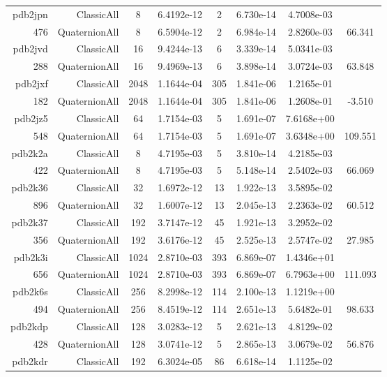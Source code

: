 \begin{xltabular}{\textwidth}{r|rcS[table-format=1.4e+2]cS[table-format=1.3e+2]S[table-format=1.4e+2]S[table-format=-1.3]}
pdb2jpn & ClassicAll & 8 & 6.4192e-12 & 2 & 6.730e-14 & 4.7008e-03 & \\
476 & QuaternionAll & 8 & 6.5904e-12 & 2 & 6.984e-14 & 2.8260e-03 & 66.341\\  \addlinespace
pdb2jvd & ClassicAll & 16 & 9.4244e-13 & 6 & 3.339e-14 & 5.0341e-03 & \\
288 & QuaternionAll & 16 & 9.4969e-13 & 6 & 3.898e-14 & 3.0724e-03 & 63.848\\  \addlinespace
pdb2jxf & ClassicAll & 2048 & 1.1644e-04 & 305 & 1.841e-06 & 1.2165e-01 & \\
182 & QuaternionAll & 2048 & 1.1644e-04 & 305 & 1.841e-06 & 1.2608e-01 & -3.510\\  \addlinespace
pdb2jz5 & ClassicAll & 64 & 1.7154e-03 & 5 & 1.691e-07 & 7.6168e+00 & \\
548 & QuaternionAll & 64 & 1.7154e-03 & 5 & 1.691e-07 & 3.6348e+00 & 109.551\\  \addlinespace
pdb2k2a & ClassicAll & 8 & 4.7195e-03 & 5 & 3.810e-14 & 4.2185e-03 & \\
422 & QuaternionAll & 8 & 4.7195e-03 & 5 & 5.148e-14 & 2.5402e-03 & 66.069\\  \addlinespace
pdb2k36 & ClassicAll & 32 & 1.6972e-12 & 13 & 1.922e-13 & 3.5895e-02 & \\
896 & QuaternionAll & 32 & 1.6007e-12 & 13 & 2.045e-13 & 2.2363e-02 & 60.512\\  \addlinespace
pdb2k37 & ClassicAll & 192 & 3.7147e-12 & 45 & 1.921e-13 & 3.2952e-02 & \\
356 & QuaternionAll & 192 & 3.6176e-12 & 45 & 2.525e-13 & 2.5747e-02 & 27.985\\  \addlinespace
pdb2k3i & ClassicAll & 1024 & 2.8710e-03 & 393 & 6.869e-07 & 1.4346e+01 & \\
656 & QuaternionAll & 1024 & 2.8710e-03 & 393 & 6.869e-07 & 6.7963e+00 & 111.093\\  \addlinespace
pdb2k6s & ClassicAll & 256 & 8.2998e-12 & 114 & 2.100e-13 & 1.1219e+00 & \\
494 & QuaternionAll & 256 & 8.4519e-12 & 114 & 2.651e-13 & 5.6482e-01 & 98.633\\  \addlinespace
pdb2kdp & ClassicAll & 128 & 3.0283e-12 & 5 & 2.621e-13 & 4.8129e-02 & \\
428 & QuaternionAll & 128 & 3.0741e-12 & 5 & 2.865e-13 & 3.0679e-02 & 56.876\\  \addlinespace
pdb2kdr & ClassicAll & 192 & 6.3024e-05 & 86 & 6.618e-14 & 1.1125e-02 & \\

\end{xltabular}
